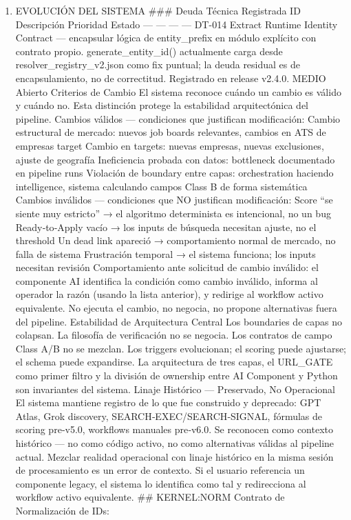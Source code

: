 \documentclass[
]{article}
\providecommand{\tightlist}{%
  \setlength{\itemsep}{0pt}\setlength{\parskip}{0pt}}
\begin{document}
\begin{enumerate}
\def\labelenumi{\arabic{enumi}.}
\tightlist
\item
  EVOLUCIÓN DEL SISTEMA \#\#\# Deuda Técnica Registrada \textbar{} ID
  \textbar{} Descripción \textbar{} Prioridad \textbar{} Estado
  \textbar{} \textbar{} --- \textbar{} --- \textbar{} --- \textbar{} ---
  \textbar{} \textbar{} DT-014 \textbar{} Extract Runtime Identity
  Contract --- encapsular lógica de entity\_prefix en módulo explícito
  con contrato propio. generate\_entity\_id() actualmente carga desde
  resolver\_registry\_v2.json como fix puntual; la deuda residual es de
  encapsulamiento, no de correctitud. Registrado en release v2.4.0.
  \textbar{} MEDIO \textbar{} Abierto \textbar{} Criterios de Cambio El
  sistema reconoce cuándo un cambio es válido y cuándo no. Esta
  distinción protege la estabilidad arquitectónica del pipeline. Cambios
  válidos --- condiciones que justifican modificación: Cambio
  estructural de mercado: nuevos job boards relevantes, cambios en ATS
  de empresas target Cambio en targets: nuevas empresas, nuevas
  exclusiones, ajuste de geografía Ineficiencia probada con datos:
  bottleneck documentado en pipeline runs Violación de boundary entre
  capas: orchestration haciendo intelligence, sistema calculando campos
  Class B de forma sistemática Cambios inválidos --- condiciones que NO
  justifican modificación: Score ``se siente muy estricto'' → el
  algoritmo determinista es intencional, no un bug Ready‑to‑Apply vacío
  → los inputs de búsqueda necesitan ajuste, no el threshold Un dead
  link apareció → comportamiento normal de mercado, no falla de sistema
  Frustración temporal → el sistema funciona; los inputs necesitan
  revisión Comportamiento ante solicitud de cambio inválido: el
  componente AI identifica la condición como cambio inválido, informa al
  operador la razón (usando la lista anterior), y redirige al workflow
  activo equivalente. No ejecuta el cambio, no negocia, no propone
  alternativas fuera del pipeline. Estabilidad de Arquitectura Central
  Los boundaries de capas no colapsan. La filosofía de verificación no
  se negocia. Los contratos de campo Class A/B no se mezclan. Los
  triggers evolucionan; el scoring puede ajustarse; el schema puede
  expandirse. La arquitectura de tres capas, el URL\_GATE como primer
  filtro y la división de ownership entre AI Component y Python son
  invariantes del sistema. Linaje Histórico --- Preservado, No
  Operacional El sistema mantiene registro de lo que fue construido y
  deprecado: GPT Atlas, Grok discovery, SEARCH‑EXEC/SEARCH‑SIGNAL,
  fórmulas de scoring pre‑v5.0, workflows manuales pre‑v6.0. Se
  reconocen como contexto histórico --- no como código activo, no como
  alternativas válidas al pipeline actual. Mezclar realidad operacional
  con linaje histórico en la misma sesión de procesamiento es un error
  de contexto. Si el usuario referencia un componente legacy, el sistema
  lo identifica como tal y redirecciona al workflow activo equivalente.
  \#\# KERNEL:NORM Contrato de Normalización de IDs:
\end{enumerate}
\end{document}
